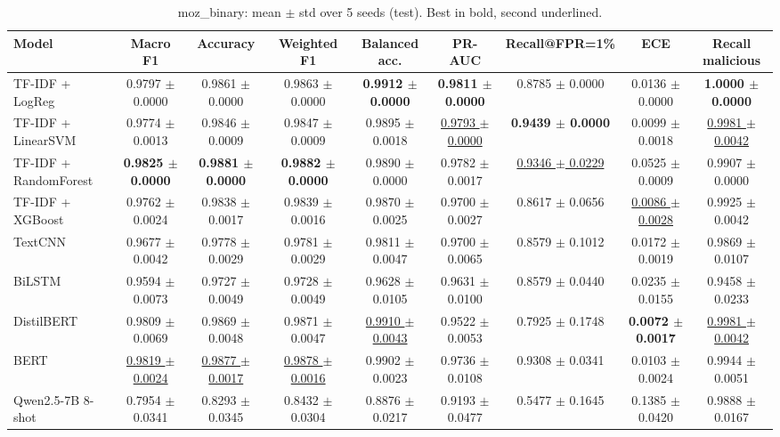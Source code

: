 \begin{table}[t]
\centering
\small
\caption{moz\_binary: mean $\pm$ std over 5 seeds (test). Best in bold, second underlined.}
\label{tab:moz_binary}
\begin{tabular}{lcccccccc}
\toprule
Model & Macro F1 & Accuracy & Weighted F1 & Balanced acc. & PR-AUC & Recall@FPR=1\% & ECE & Recall malicious \\
\midrule
TF-IDF + LogReg & 0.9797 $\pm$ 0.0000 & 0.9861 $\pm$ 0.0000 & 0.9863 $\pm$ 0.0000 & \textbf{0.9912 $\pm$ 0.0000} & \textbf{0.9811 $\pm$ 0.0000} & 0.8785 $\pm$ 0.0000 & 0.0136 $\pm$ 0.0000 & \textbf{1.0000 $\pm$ 0.0000} \\
TF-IDF + LinearSVM & 0.9774 $\pm$ 0.0013 & 0.9846 $\pm$ 0.0009 & 0.9847 $\pm$ 0.0009 & 0.9895 $\pm$ 0.0018 & \underline{0.9793 $\pm$ 0.0000} & \textbf{0.9439 $\pm$ 0.0000} & 0.0099 $\pm$ 0.0018 & \underline{0.9981 $\pm$ 0.0042} \\
TF-IDF + RandomForest & \textbf{0.9825 $\pm$ 0.0000} & \textbf{0.9881 $\pm$ 0.0000} & \textbf{0.9882 $\pm$ 0.0000} & 0.9890 $\pm$ 0.0000 & 0.9782 $\pm$ 0.0017 & \underline{0.9346 $\pm$ 0.0229} & 0.0525 $\pm$ 0.0009 & 0.9907 $\pm$ 0.0000 \\
TF-IDF + XGBoost & 0.9762 $\pm$ 0.0024 & 0.9838 $\pm$ 0.0017 & 0.9839 $\pm$ 0.0016 & 0.9870 $\pm$ 0.0025 & 0.9700 $\pm$ 0.0027 & 0.8617 $\pm$ 0.0656 & \underline{0.0086 $\pm$ 0.0028} & 0.9925 $\pm$ 0.0042 \\
TextCNN & 0.9677 $\pm$ 0.0042 & 0.9778 $\pm$ 0.0029 & 0.9781 $\pm$ 0.0029 & 0.9811 $\pm$ 0.0047 & 0.9700 $\pm$ 0.0065 & 0.8579 $\pm$ 0.1012 & 0.0172 $\pm$ 0.0019 & 0.9869 $\pm$ 0.0107 \\
BiLSTM & 0.9594 $\pm$ 0.0073 & 0.9727 $\pm$ 0.0049 & 0.9728 $\pm$ 0.0049 & 0.9628 $\pm$ 0.0105 & 0.9631 $\pm$ 0.0100 & 0.8579 $\pm$ 0.0440 & 0.0235 $\pm$ 0.0155 & 0.9458 $\pm$ 0.0233 \\
DistilBERT & 0.9809 $\pm$ 0.0069 & 0.9869 $\pm$ 0.0048 & 0.9871 $\pm$ 0.0047 & \underline{0.9910 $\pm$ 0.0043} & 0.9522 $\pm$ 0.0053 & 0.7925 $\pm$ 0.1748 & \textbf{0.0072 $\pm$ 0.0017} & \underline{0.9981 $\pm$ 0.0042} \\
BERT & \underline{0.9819 $\pm$ 0.0024} & \underline{0.9877 $\pm$ 0.0017} & \underline{0.9878 $\pm$ 0.0016} & 0.9902 $\pm$ 0.0023 & 0.9736 $\pm$ 0.0108 & 0.9308 $\pm$ 0.0341 & 0.0103 $\pm$ 0.0024 & 0.9944 $\pm$ 0.0051 \\
Qwen2.5-7B 8-shot & 0.7954 $\pm$ 0.0341 & 0.8293 $\pm$ 0.0345 & 0.8432 $\pm$ 0.0304 & 0.8876 $\pm$ 0.0217 & 0.9193 $\pm$ 0.0477 & 0.5477 $\pm$ 0.1645 & 0.1385 $\pm$ 0.0420 & 0.9888 $\pm$ 0.0167 \\
\bottomrule
\end{tabular}
\end{table}
